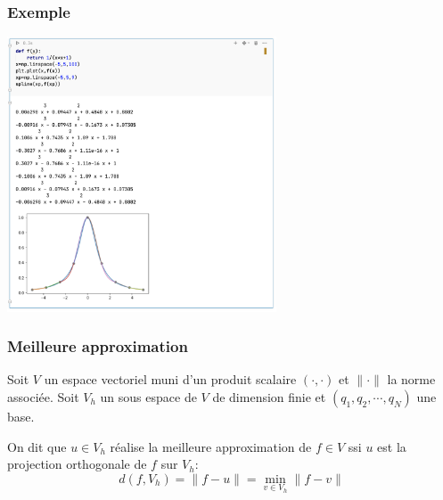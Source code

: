\documentclass{beamer}
\begin{document}
\begin{frame}
 \frametitle{Exemple}
\begin{center}
\includegraphics[width=8cm]{images/interpolationDHermite05.png}
\end{center}
\end{frame}

\begin{frame}
 \frametitle{Meilleure approximation}
Soit $V$ un espace vectoriel muni d'un produit scalaire $(\cdot, \cdot)$ et $\|\cdot\|$ la norme associée.
Soit $V_h$ un sous espace de $V$ de dimension finie et $(q_1, q_2, \cdots, q_N)$ une base.

On dit que $u \in V_h$ réalise la meilleure approximation de $f \in V$ ssi $u$ est la projection orthogonale de $f$ sur $V_h$:
\[ d(f,V_h)=\|f-u\|=\min_{v\in V_h}\|f-v\| \]

\begin{center}
 \end{center}



\end{frame}
\end{document}

